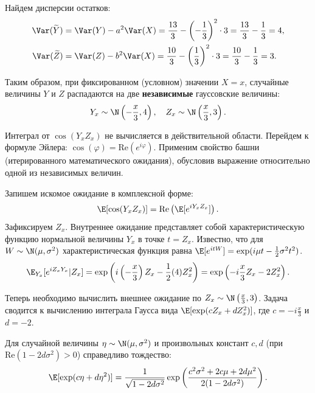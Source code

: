 \begin{Solution}
    Найдем дисперсии остатков:
    \begin{align*}
        \Var(\widetilde{Y}) &= \Var(Y) - a^2\Var(X) = \frac{13}{3} - \left(-\frac{1}{3}\right)^2 \cdot 3 = \frac{13}{3} - \frac{1}{3} = 4, \\
        \Var(\widetilde{Z}) &= \Var(Z) - b^2\Var(X) = \frac{10}{3} - \left(\frac{1}{3}\right)^2 \cdot 3 = \frac{10}{3} - \frac{1}{3} = 3.
    \end{align*}

    Таким образом, при фиксированном (условном) значении $X = x$, случайные величины $Y$ и $Z$ распадаются на две \textbf{независимые} гауссовские величины:
    \[
    Y_x \sim \N\left(-\frac{x}{3}, 4\right), \quad Z_x \sim \N\left(\frac{x}{3}, 3\right).
    \]

    \begin{HackBox}
        Интеграл от $\cos(Y_x Z_x)$ не вычисляется в действительной области. Перейдем к формуле Эйлера: $\cos(\varphi) = \text{Re}(e^{i\varphi})$. Применим свойство башни (итерированного математического ожидания), обусловив выражение относительно одной из независимых величин.
    \end{HackBox}

    Запишем искомое ожидание в комплексной форме:
    \[
    \E[\cos(Y_x Z_x)] = \text{Re}\left( \E[e^{i Y_x Z_x}] \right).
    \]
    Зафиксируем $Z_x$. Внутреннее ожидание представляет собой характеристическую функцию нормальной величины $Y_x$ в точке $t = Z_x$. Известно, что для $W \sim \N(\mu, \sigma^2)$ характеристическая функция равна $\E[e^{itW}] = \exp(i\mu t - \frac{1}{2}\sigma^2 t^2)$.
    \[
    \E_{Y_x}[e^{i Z_x Y_x} | Z_x] = \exp\left( i \left(-\frac{x}{3}\right) Z_x - \frac{1}{2}(4) Z_x^2 \right) = \exp\left( -i\frac{x}{3} Z_x - 2 Z_x^2 \right).
    \]

    Теперь необходимо вычислить внешнее ожидание по $Z_x \sim \N\left(\frac{x}{3}, 3\right)$. Задача сводится к вычислению интеграла Гаусса вида $\E[\exp(c Z_x + d Z_x^2)]$, где $c = -i\frac{x}{3}$ и $d = -2$.

    Для случайной величины $\eta \sim \N(\mu, \sigma^2)$ и произвольных констант $c, d$ (при $\text{Re}(1-2d\sigma^2)>0$) справедливо тождество:
    \[
    \E[\exp(c\eta + d\eta^2)] = \frac{1}{\sqrt{1 - 2d\sigma^2}} \exp\left( \frac{c^2\sigma^2 + 2c\mu + 2d\mu^2}{2(1 - 2d\sigma^2)} \right).
    \]


\end{Solution}
